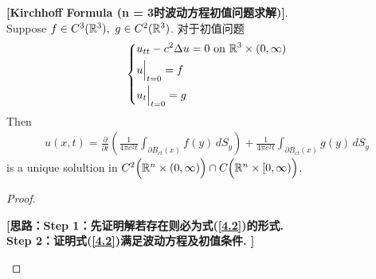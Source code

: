 	\begin{thm}\label{thm 4.2.1}
		\textbf{[Kirchhoff Formula (n = 3时波动方程初值问题求解)]}. \\
		Suppose $f \in C^3(\mathbb{R}^3) , \,\, g \in C^2(\mathbb{R}^3)$. 对于初值问题 
		\begin{align*}
			\begin{dcases*}
				u_{tt} - c^2 \Delta u = 0 \,\, \text{on} \,\, \R^3 \times (0 , \infty) \\
				u \Big|_{t = 0} = f \\
				u_t \Big|_{t = 0} = g
			\end{dcases*}
		\end{align*}
		Then  
		\begin{align}
			u(x , t) 
			= \frac{\partial}{\partial t} \left( \frac{1}{4 \pi c^2 t} \int_{\partial B_{ct}(x)} f(y) \, dS_y \right) + \frac{1}{4 \pi c^2 t} \int_{\partial B_{ct}(x)} g(y) \, dS_y \label{4.2}
		\end{align}
		is a unique solultion in $C^2 \Big( \mathbb{R}^n \times (0 , \infty) \Big) \cap C\Big( \mathbb{R}^n \times [0 , \infty) \Big)$. 
		
		\newpage
		
		\begin{proof}
			\begin{center}
				\textbf{[思路：Step 1：先证明解若存在则必为式(\ref{4.2})的形式. \\
					\hspace{4em}Step 2：证明式(\ref{4.2})满足波动方程及初值条件. ]}
			\end{center}
			
			\vspace*{1em}
			

\end{proof}
\end{thm}
